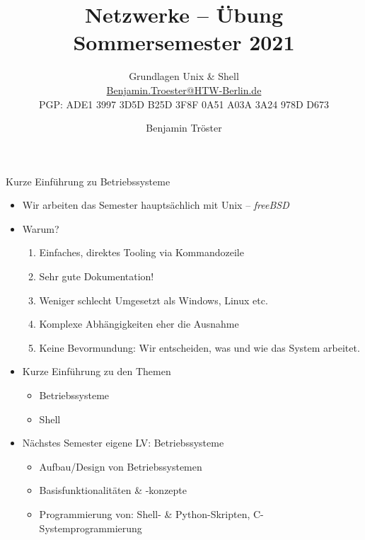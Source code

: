 \documentclass[xcolor=dvipsnames,aspectratio=169]{beamer}
\begin{document}

\title{Netzwerke -- Übung\\Sommersemester 2021}
\subtitle{Grundlagen Unix \& Shell\\
\href{mailto:Benjamin.Troester@HTW-Berlin.de}{Benjamin.Troester@HTW-Berlin.de}\\
		PGP: ADE1 3997 3D5D B25D 3F8F 0A51 A03A 3A24 978D D673 }

\author{Benjamin Tröster}

\date{}

\begin{frame}
\titlepage
\end{frame}

\begin{frame}{Kurze Einführung zu Betriebssysteme}
 \vspace*{-0.8cm} 
	\begin{itemize}
		\item Wir arbeiten das Semester hauptsächlich mit Unix -- \emph{freeBSD}
		\item Warum?
		\begin{enumerate}
			\item Einfaches, direktes Tooling via Kommandozeile
			\item Sehr gute Dokumentation!
			\item Weniger schlecht Umgesetzt als Windows, Linux etc.
			\item Komplexe Abhängigkeiten eher die Ausnahme
			\item Keine Bevormundung: Wir entscheiden, was und wie das System arbeitet.
		\end{enumerate}
		\item Kurze Einführung zu den Themen
		\begin{itemize}
			\item Betriebssysteme
			\item Shell
		\end{itemize}
		\item Nächstes Semester eigene LV: Betriebssysteme
		\begin{itemize}
			\item Aufbau/Design von Betriebssystemen
			\item Basisfunktionalitäten \& -konzepte
			\item Programmierung von: Shell- \& Python-Skripten, C-Systemprogrammierung
		\end{itemize}
	\end{itemize}
\end{frame}
\end{document}
